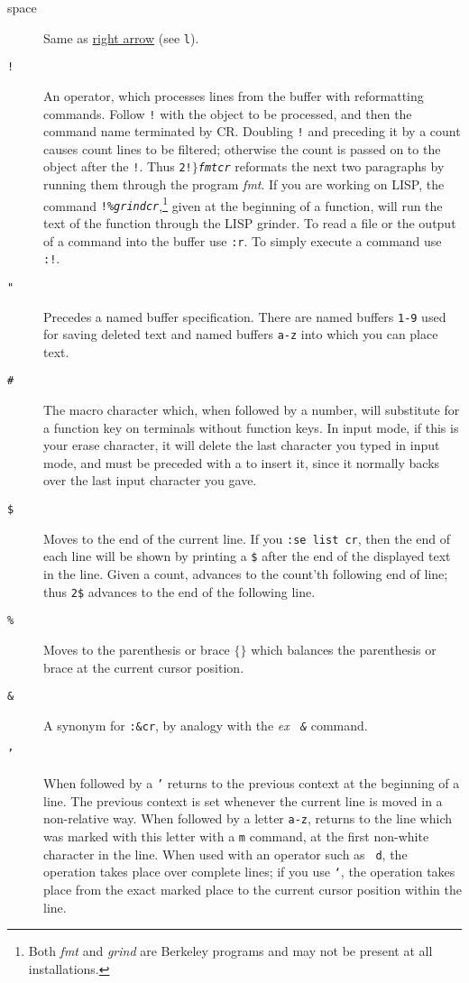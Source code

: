 \begin{description}
\item[{\sc space}] Same as \ul{right arrow} (see {\tt l}).

\item[{\tt !}] An operator, which processes lines from the buffer with
reformatting commands. Follow {\tt !} with the object to be processed, and
then the command name terminated by CR. Doubling {\tt !} and preceding it by a
count causes count lines to be filtered; otherwise the count is passed on to
the object after the {\tt !}. Thus {\tt 2!$\rbrace$\it fmt\/\sc cr} reformats
the next two paragraphs by running them through the program {\it fmt}. If you
are working on LISP, the command {\tt !\%\it grind\/\sc cr},\footnote{ Both
{\it fmt} and {\it grind} are Berkeley programs and may not be present at all
installations.} given at the beginning of a function, will run the text of the
function through the LISP grinder. To read a file or the output of a command
into the buffer use {\tt :r}. To simply execute a command use {\tt :!}.

\item[{\tt "}] Precedes a named buffer specification. There are named buffers
{\tt 1-9} used for saving deleted text and named buffers {\tt a-z} into which
you can place text.

\item[{\tt \#}] The macro character which, when followed by a number, will
substitute for a function key on terminals without function keys. In input
mode, if this is your erase character, it will delete the last character you
typed in input mode, and must be preceded with a {\tt{}} to insert
it, since it normally backs over the last input character you gave.

\item[{\tt \$}] Moves to the end of the current line. If you {\tt :se list\sc
cr}, then the end of each line will be shown by printing a {\tt \$} after the
end of the displayed text in the line. Given a count, advances to the count'th
following end of line; thus {\tt 2\$} advances to the end of the following
line.

\item[{\tt \%}] Moves to the parenthesis or brace $\lbrace \rbrace$ which
balances the parenthesis or brace at the current cursor position.

\item[{\tt \&}] A synonym for {\tt :\&\sc cr}, by analogy with the {\it ex \tt
\&} command.

\item[{\tt '}] When followed by a {\tt '} returns to the previous context at
the beginning of a line. The previous context is set whenever the current line
is moved in a non-relative way. When followed by a letter {\tt a-z}, returns
to the line which was marked with this letter with a {\tt m} command, at the
first non-white character in the line. When used with an operator such as {\tt
d}, the operation takes place over complete lines; if you use {\tt `}, the
operation takes place from the exact marked place to the current cursor
position within the line.


\end{description}
